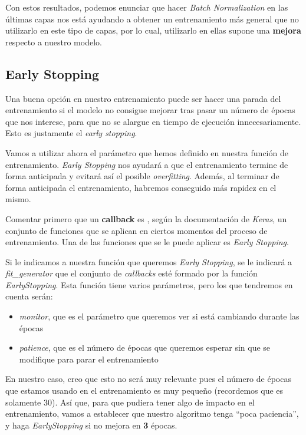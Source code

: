 \documentclass[11pt]{article}
\begin{document}
Con estos resultados, podemos enunciar que hacer \emph{Batch
Normalization} en las últimas capas nos está ayudando a obtener un
entrenamiento más general que no utilizarlo en este tipo de capas, por
lo cual, utilizarlo en ellas supone una \textbf{mejora} respecto a
nuestro modelo.

\hypertarget{early-stopping}{%
\subsection{Early Stopping}\label{early-stopping}}

Una buena opción en nuestro entrenamiento puede ser hacer una parada del
entrenamiento si el modelo no consigue mejorar tras pasar un número de
épocas que nos interese, para que no se alargue en tiempo de ejecución
innecesariamente. Esto es justamente el \emph{early stopping}.

Vamos a utilizar ahora el parámetro que hemos definido en nuestra
función de entrenamiento. \emph{Early Stopping} nos ayudará a que el
entrenamiento termine de forma anticipada y evitará así el posible
\emph{overfitting}. Además, al terminar de forma anticipada el
entrenamiento, habremos conseguido más rapidez en el mismo.

Comentar primero que un \textbf{callback} es , según la documentación de
\emph{Keras}, un conjunto de funciones que se aplican en ciertos
momentos del proceso de entrenamiento. Una de las funciones que se le
puede aplicar es \emph{Early Stopping}.

Si le indicamos a nuestra función que queremos \emph{Early Stopping}, se
le indicará a \emph{fit\_generator} que el conjunto de \emph{callbacks}
esté formado por la función \emph{EarlyStopping}. Esta función tiene
varios parámetros, pero los que tendremos en cuenta serán:
\begin{itemize} \item
\emph{monitor}, que es el parámetro que queremos ver si está cambiando
durante las épocas 

\item \emph{patience}, que es el número de épocas que
queremos esperar sin que se modifique para parar el entrenamiento
\end{itemize}
En nuestro caso, creo que esto no será muy relevante pues el número de
épocas que estamos usando en el entrenamiento es muy pequeño (recordemos
que es solamente 30). Así que, para que pudiera tener algo de impacto en
el entrenamiento, vamos a establecer que nuestro algoritmo tenga ``poca
paciencia'', y haga \emph{EarlyStopping} si no mejora en \textbf{3}
épocas.
\end{document}
